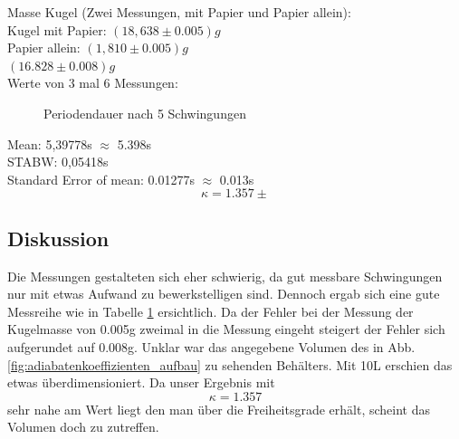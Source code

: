 \documentclass[12pt,a4paper]{article}
\begin{document}
\begin{multicols}{2}
Masse Kugel (Zwei Messungen, mit Papier und Papier allein):\\
Kugel mit Papier: $(18,638 \pm 0.005)g$\\
Papier allein: $(1,810 \pm 0.005)g$\\
$(16.828 \pm 0.008)g$ \\
Werte von 3 mal 6 Messungen:
\begin{figure}[H]
	\centering
	\caption{Periodendauer nach 5 Schwingungen}
	\label{fig:adiabaten_periode_messung}
\end{figure}
\noindent
Mean: 5,39778s $\approx$ 5.398s\\
STABW: 0,05418s\\
Standard Error of mean: 0.01277s $\approx$ 0.013s\\
$$\kappa = 1.357 \pm $$
\subsection{Diskussion}
Die Messungen gestalteten sich eher schwierig, da gut messbare Schwingungen nur mit etwas Aufwand zu bewerkstelligen sind. Dennoch ergab sich eine gute Messreihe wie in Tabelle \ref{fig:adiabaten_periode_messung} ersichtlich.
Da der Fehler bei der Messung der Kugelmasse von 0.005g zweimal in die Messung eingeht steigert der Fehler sich aufgerundet auf 0.008g. Unklar war das angegebene Volumen des in Abb. \ref{fig:adiabatenkoeffizienten_aufbau} zu sehenden Behälters. Mit 10L erschien das etwas überdimensioniert. Da unser Ergebnis mit $$\kappa = 1.357$$ sehr nahe am Wert liegt den man über die Freiheitsgrade erhält, scheint das Volumen doch zu zutreffen.


\end{multicols}
\end{document}

